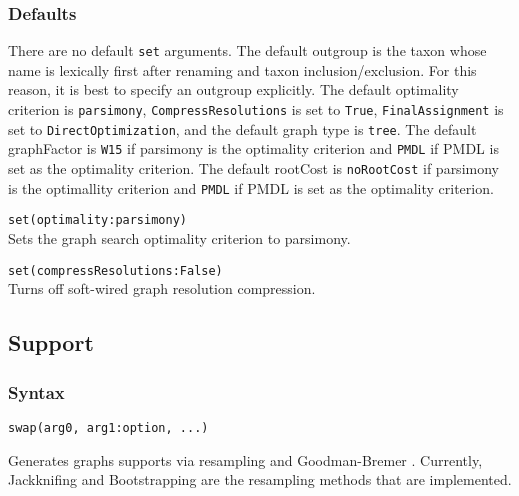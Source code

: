 	\subsubsection{Defaults} 
		There are no default \texttt{set} arguments. The default outgroup is the taxon whose name is 
		lexically first after renaming and taxon inclusion/exclusion. For this reason, it is best to specify 
		an outgroup explicitly. The default optimality criterion is \texttt{parsimony}, \texttt{CompressResolutions} 
		is set to \texttt{True}, \texttt{FinalAssignment} is set to \texttt{DirectOptimization}, and the default 
		graph type is \texttt{tree}. The default graphFactor is \texttt{W15} if parsimony is the optimality 
		criterion and \texttt{PMDL} if PMDL is set as the optimality criterion. The default rootCost
		is \texttt{noRootCost} if parsimony is the optimallity criterion and \texttt{PMDL} if PMDL is set 
		as the optimality criterion.
		
	\begin{example}
		\item{\texttt{set(optimality:parsimony)}\\Sets the graph search optimality criterion to parsimony.}
						
		\item{\texttt{set(compressResolutions:False)}\\Turns off soft-wired graph resolution compression.}
	\end{example}

\subsection{Support}
	\subsubsection{Syntax}
		\texttt{swap(arg0, arg1:option, ...)}
		
	\begin{phygdescription}
		{Generates graphs supports via resampling \citep{Farrisetal1996} and Goodman-Bremer 
		\citep{Goodmanetal1982, bremer1994}. Currently, Jackknifing and Bootstrapping 
		are the resampling methods that are implemented.}
	\end{phygdescription}
		
